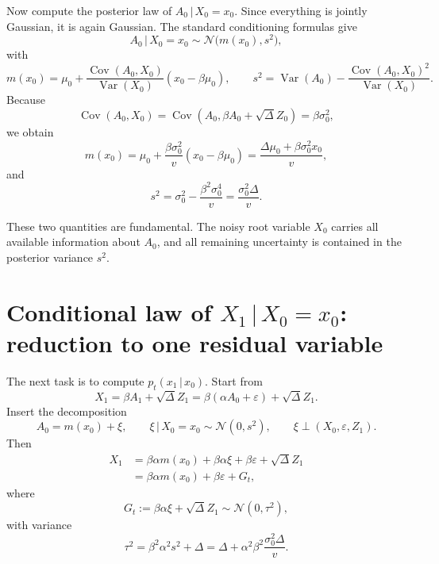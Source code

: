 \documentclass[11pt]{article}
\newcommand{\Var}{\operatorname{Var}}
\newcommand{\Cov}{\operatorname{Cov}}
\newcommand{\1}{\mathbf{1}}
\newcommand{\pt}{p_t}
\newcommand{\Normal}{\mathcal{N}}
\newcommand{\given}{\,|\,}
\theoremstyle{definition}
\begin{document}
Now compute the posterior law of \(A_0\given X_0=x_0\). Since everything is jointly Gaussian, it is again Gaussian. The standard conditioning formulas give
\begin{equation}
\label{eq:posterior-A0-X0}
A_0\given X_0=x_0 \sim \Normal\big(m(x_0),s^2\big),
\end{equation}
with
\begin{equation}
\label{eq:m-s-definitions}
m(x_0)=\mu_0 + \frac{\Cov(A_0,X_0)}{\Var(X_0)}(x_0-\beta\mu_0),
\qquad
s^2 = \Var(A_0)-\frac{\Cov(A_0,X_0)^2}{\Var(X_0)}.
\end{equation}
Because
\begin{equation}
\Cov(A_0,X_0)=\Cov(A_0,\beta A_0 + \sqrt{\Delta}Z_0)=\beta\sigma_0^2,
\end{equation}
we obtain
\begin{equation}
\label{eq:m-explicit}
m(x_0)=\mu_0 + \frac{\beta\sigma_0^2}{v}(x_0-\beta\mu_0)
=\frac{\Delta\mu_0+\beta\sigma_0^2 x_0}{v},
\end{equation}
and
\begin{equation}
\label{eq:s2-explicit}
s^2 = \sigma_0^2 - \frac{\beta^2\sigma_0^4}{v}
=\frac{\sigma_0^2\Delta}{v}.
\end{equation}

These two quantities are fundamental. The noisy root variable \(X_0\) carries all available information about \(A_0\), and all remaining uncertainty is contained in the posterior variance \(s^2\).

\section{Conditional law of \(X_1\given X_0=x_0\): reduction to one residual variable}

The next task is to compute \(\pt(x_1\given x_0)\). Start from
\begin{equation}
X_1 = \beta A_1 + \sqrt{\Delta} Z_1 = \beta(\alpha A_0 + \varepsilon)+\sqrt{\Delta} Z_1.
\end{equation}
Insert the decomposition
\begin{equation}
A_0 = m(x_0)+\xi,
\qquad
\xi\given X_0=x_0 \sim \Normal(0,s^2),
\qquad
\xi \perp (X_0,\varepsilon,Z_1).
\end{equation}
Then
\begin{align}
X_1
&= \beta\alpha m(x_0) + \beta\alpha\xi + \beta\varepsilon + \sqrt{\Delta}Z_1 \\
&= \beta\alpha m(x_0) + \beta\varepsilon + G_t,
\end{align}
where
\begin{equation}
\label{eq:Gt-definition}
G_t := \beta\alpha\xi + \sqrt{\Delta}Z_1 \sim \Normal(0,\tau^2),
\end{equation}
with variance
\begin{equation}
\label{eq:tau2-definition}
\tau^2 = \beta^2\alpha^2 s^2 + \Delta
= \Delta + \alpha^2\beta^2\frac{\sigma_0^2\Delta}{v}.
\end{equation}
\end{document}
